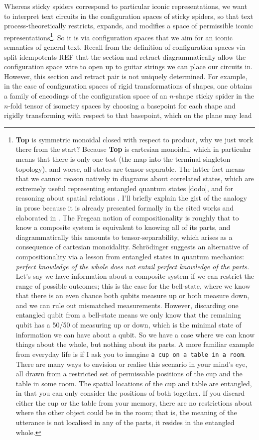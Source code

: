 Whereas sticky spiders correspond to particular iconic representations, we want to interpret text circuits in the configuration spaces of sticky spiders, so that text process-theoretically restricts, expands, and modifies a space of permissible iconic representations\footnote{\textbf{Top} is symmetric monoidal closed with respect to product, why we just work there from the start? Because \textbf{Top} is cartesian monoidal, which in particular means that there is only one test (the map into the terminal singleton topology), and worse, all states are tensor-separable. The latter fact means that we cannot reason natively in diagrams about correlated states, which are extremely useful representing entangled quantum states [dodo], and for reasoning about spatial relations \bR [talkspace] \e. I'll briefly explain the gist of the analogy in prose because it is already presented formally in the cited works and elaborated in \bR [bobcomp] \e. The Fregean notion of compositionality is roughly that to know a composite system is equivalent to knowing all of its parts, and diagrammatically this amounts to tensor-separability, which arises as a consequence of cartesian monoidality. Schr\"{o}dinger suggests an alternative of compositionality via a lesson from entangled states in quantum mechanics: \emph{perfect knowledge of the whole does not entail perfect knowledge of the parts.} Let's say we have information about a composite system if we can restrict the range of possible outcomes; this is the case for the bell-state, where we know that there is an even chance both qubits measure up or both measure down, and we can rule out mismatched measurements. However, discarding one entangled qubit from a bell-state means we only know that the remaining qubit has a 50/50 of measuring up or down, which is the minimal state of information we can have about a qubit. So we have a case where we can know things about the whole, but nothing about its parts. A more familiar example from everyday life is if I ask you to imagine \texttt{a cup on a table in a room}. There are many ways to envision or realise this scenario in your mind's eye, all drawn from a restricted set of permissable positions of the cup and the table in some room. The spatial locations of the cup and table are entangled, in that you can only consider the positions of both together. If you discard either the cup or the table from your memory, there are no restrictions about where the other object could be in the room; that is, the meaning of the utterance is not localised in any of the parts, it resides in the entangled whole.}. So it is via configuration spaces that we aim for an iconic semantics of general text. Recall from the definition of configuration spaces via split idempotents \bR REF \e that the section and retract diagrammatically allow the configuration space wire to open up to guitar strings we can place our circuits in. However, this section and retract pair is not uniquely determined. For example, in the case of configuration spaces of rigid transformations of shapes, one obtains a family of encodings of the configuration space of an $n$-shape sticky spider in the $n$-fold tensor of isometry spaces by choosing a basepoint for each shape and rigidly transforming with respect to that basepoint, which on the plane may lead 